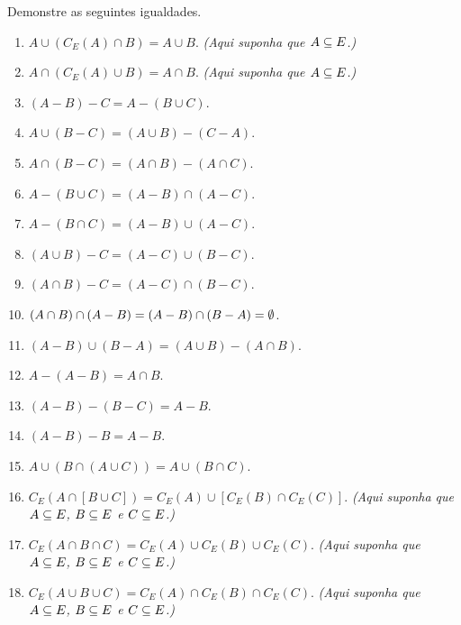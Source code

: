\documentclass[12pt]{exam}
\begin{document}
\vspace{.3cm}

\questao Demonstre as seguintes igualdades.
\begin{enumerate}[label={\alph*})]
\item $A \cup (C_E(A) \cap B) = A \cup B$. \textit{(Aqui suponha que $A \subseteq E$.)}

\item $A \cap (C_E(A) \cup B) = A \cap B$. \textit{(Aqui suponha que $A \subseteq E$.)}

\item $(A - B) - C = A - (B \cup C)$.

\item $A \cup (B - C) = (A \cup B) - (C - A)$.

\item $A \cap (B - C) = (A \cap B) - (A \cap C)$.

\item $A - (B \cup C) = (A - B) \cap (A - C)$.

\item $A - (B \cap C) = (A - B) \cup (A - C)$.

\item $(A \cup B) - C = (A - C) \cup (B - C)$.

\item $(A \cap B) - C = (A - C) \cap (B - C)$.

\item $(A \cap B) \cap (A - B) = (A - B) \cap (B - A) = \emptyset$.

\item $(A - B) \cup (B - A) = (A \cup B) - (A \cap B)$.

\item $A - (A - B) = A \cap B$.

\item $(A - B) - (B - C) = A - B$.

\item $(A - B) - B = A - B$.

\item $A \cup (B \cap (A \cup C)) = A \cup (B \cap C)$.

\item $C_E( A \cap [B \cup C]) = C_E(A) \cup [C_E(B)\cap C_E(C)]$. \textit{(Aqui suponha que $A \subseteq E$, $B \subseteq E$ e $C \subseteq E$.)}

\item $C_E( A \cap B \cap C) = C_E(A) \cup C_E(B) \cup C_E(C)$. \textit{(Aqui suponha que $A \subseteq E$, $B \subseteq E$ e $C \subseteq E$.)}

\item $C_E( A \cup B \cup C) = C_E(A) \cap C_E(B) \cap C_E(C)$. \textit{(Aqui suponha que $A \subseteq E$, $B \subseteq E$ e $C \subseteq E$.)}
\end{enumerate}
\end{document}
